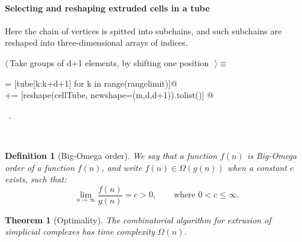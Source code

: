 \documentclass[11pt,oneside]{article}	%
\newtheorem{definition}{Definition}
\newtheorem{theorem}{Theorem}
\begin{document}
\paragraph{Selecting and reshaping extruded cells in a tube}
Here the chain of vertices is spitted into subchains, and such subchains are reshaped into three-dimensional arrays of indices.
\begin{flushleft} \small
\begin{minipage}{\linewidth} \label{scrap4}
$\langle\,$Take groups of d+1 elements, by shifting one position\nobreak\ {\footnotesize {}}$\,\rangle\equiv$
\vspace{-1ex}
\begin{list}{}{} \item
\mbox{}\verb@cellTube = [tube[k:k+d+1] for k in range(rangelimit)]@\\
\mbox{}\verb@outcells += [reshape(cellTube, newshape=(m,d,d+1)).tolist()]   @{\NWsep}
\end{list}
\vspace{-1ex}
\footnotesize\addtolength{\baselineskip}{-1ex}
\begin{list}{}{\setlength{\itemsep}{-\parsep}\setlength{\itemindent}{-\leftmargin}}
\item \NWtxtMacroRefIn\ .
\end{list}
\end{minipage}\\[4ex]
\end{flushleft}



\begin{definition}[Big-Omega order]
We say that a function $f(n)$ is \emph{Big-Omega} order of a function $f(n)$, and write 
$f(n) \in \Omega(g(n))$ when a constant $c$ exists, such that:
\[
\lim_{n\to\infty} \frac{f(n)}{g(n)}=c>0,\qquad \mbox{where\ } 0<c\leq\infty.
\]
\end{definition}



\begin{theorem}[Optimality]
The combinatorial algorithm for extrusion of simplicial complexes has time complexity $\Omega(n)$.
\end{theorem}
\end{document}
